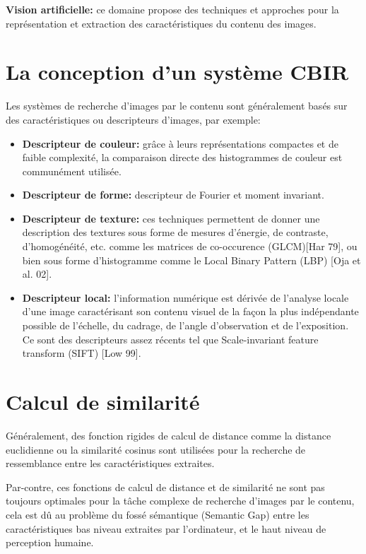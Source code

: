 \textbf{Vision artificielle:} ce domaine propose des techniques et approches pour la représentation et extraction des caractéristiques du contenu des images.


\section{La conception d'un système CBIR}

	Les systèmes de recherche d'images par le contenu sont généralement basés sur des caractéristiques ou descripteurs d'images, par exemple:
	
\begin{itemize}

\item \textbf{Descripteur  de couleur:} grâce à leurs représentations compactes et de faible complexité, la comparaison directe des histogrammes de couleur est communément utilisée.
\item \textbf{Descripteur de forme:} descripteur de Fourier et moment invariant.
\item \textbf{Descripteur de texture:} ces techniques permettent de donner une description des textures sous forme de mesures d'énergie, de contraste, d'homogénéité, etc. comme les matrices de co-occurence (GLCM)[Har 79], ou bien sous forme d'histogramme comme le Local Binary Pattern (LBP) [Oja et al. 02].
\item \textbf{Descripteur local:}  l'information numérique est dérivée de l'analyse locale d'une image caractérisant son contenu visuel de la façon la plus indépendante possible de l'échelle, du cadrage, de l'angle d'observation et de l'exposition. Ce sont des descripteurs assez récents tel que Scale-invariant feature transform (SIFT) [Low 99].

\end{itemize}

\section{Calcul de similarité}

	Généralement, des fonction rigides de calcul de distance comme la distance euclidienne ou la similarité cosinus sont utilisées pour la recherche de ressemblance entre les caractéristiques extraites.

	Par-contre, ces fonctions de calcul de distance et de similarité ne sont pas toujours optimales pour la tâche complexe de recherche d'images par le contenu, cela est dû au problème du fossé sémantique (Semantic Gap) entre les caractéristiques bas niveau extraites par l'ordinateur, et le haut niveau de perception humaine.

